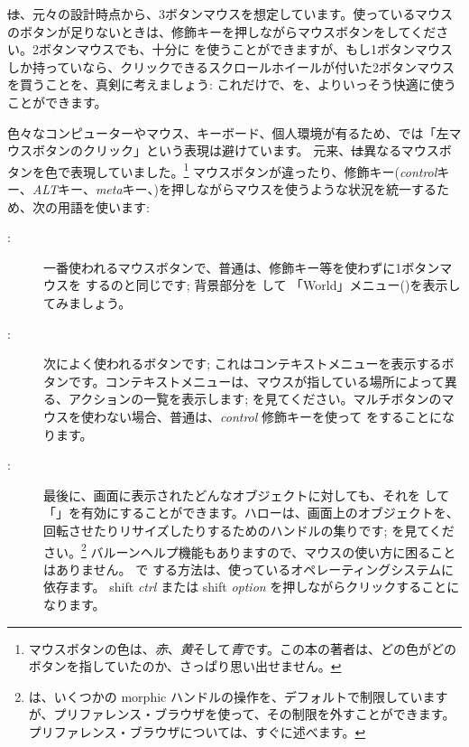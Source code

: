 \documentclass[a4paper,10pt,twoside]{book}
\begin{document}
\st は、元々の設計時点から、3ボタンマウスを想定しています。使っているマウスのボタンが足りないときは、修飾キーを押しながらマウスボタンを\click してください。2ボタンマウスでも、十分に \pharo を使うことができますが、もし1ボタンマウスしか持っていなら、クリックできるスクロールホイールが付いた2ボタンマウスを買うことを、真剣に考えましょう: これだけで、\pharo を、よりいっそう快適に使うことができます。

色々なコンピューターやマウス、キーボード、個人環境が有るため、\pharo では「左マウスボタンのクリック」という表現は避けています。
元来、\st は異なるマウスボタンを色で表現していました。\footnote{マウスボタンの色は、\emph{赤}、\emph{黄}そして\emph{青}です。この本の著者は、どの色がどのボタンを指していたのか、さっぱり思い出せません。}
マウスボタンが違ったり、修飾キー(\emph{control}キー、\emph{ALT}キー、\emph{meta}キー、\etc)を押しながらマウスを使うような状況を統一するため、次の用語を使います:
\begin{description}
\item [\click:] 一番使われるマウスボタンで、普通は、修飾キー等を使わずに1ボタンマウスを \click するのと同じです; 背景部分を \click して 「World」メニュー()を表示してみましょう。
\item [\actclick:] 次によく使われるボタンです; これはコンテキストメニューを表示するボタンです。コンテキストメニューは、マウスが指している場所によって異る、アクションの一覧を表示します; を見てください。マルチボタンのマウスを使わない場合、普通は、\emph{control} 修飾キーを使って \actclick をすることになります。
\item [\metaclick:] 最後に、画面に表示されたどんなオブジェクトに対しても、それを \metaclick して「」を有効にすることができます。ハローは、画面上のオブジェクトを、回転させたりリサイズしたりするためのハンドルの集りです; を見てください。\footnote{\pharo は、いくつかの morphic ハンドルの操作を、デフォルトで制限していますが、プリファレンス・ブラウザを使って、その制限を外すことができます。プリファレンス・ブラウザについては、すぐに述べます。}
バルーンヘルプ機能もありますので、マウスの使い方に困ることはありません。
\pharo で \metaclick する方法は、使っているオペレーティングシステムに依存ます。
{\sc shift} \emph{ctrl} または {\sc shift} \emph{option} を押しながらクリックすることになります。
\end{description}
\end{document}
